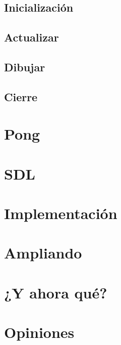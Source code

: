 \documentclass{beamer}
\begin{document}
\subsection{Inicialización}

\subsection{Actualizar}

\subsection{Dibujar}

\subsection{Cierre}

\section{Pong}

\section{SDL}

\section{Implementación}

\section{Ampliando}

\section{¿Y ahora qué?}

\section{Opiniones}
\end{document}
